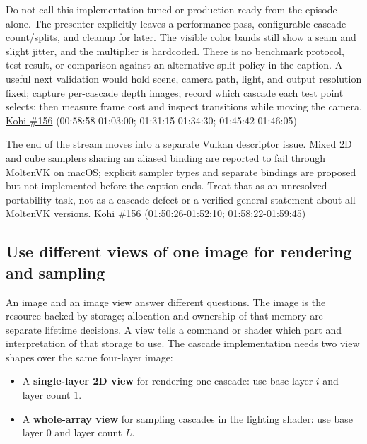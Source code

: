 Do not call this implementation tuned or production-ready from the episode alone. The presenter explicitly leaves a performance pass, configurable cascade count/splits, and cleanup for later. The visible color bands still show a seam and slight jitter, and the multiplier is hardcoded. There is no benchmark protocol, test result, or comparison against an alternative split policy in the caption. A useful next validation would hold scene, camera path, light, and output resolution fixed; capture per-cascade depth images; record which cascade each test point selects; then measure frame cost and inspect transitions while moving the camera. \href{https://www.youtube.com/watch?v=coWS_saBPBk}{Kohi \#156} (00:58:58-01:03:00; 01:31:15-01:34:30; 01:45:42-01:46:05)

The end of the stream moves into a separate Vulkan descriptor issue. Mixed 2D and cube samplers sharing an aliased binding are reported to fail through MoltenVK on macOS; explicit sampler types and separate bindings are proposed but not implemented before the caption ends. Treat that as an unresolved portability task, not as a cascade defect or a verified general statement about all MoltenVK versions. \href{https://www.youtube.com/watch?v=coWS_saBPBk}{Kohi \#156} (01:50:26-01:52:10; 01:58:22-01:59:45)

\subsection{Use different views of one image for rendering and sampling}\label{06-engine-ii-ch026-use-different-views-of-one-image-for-rendering-and-sampling}

\hypertarget{06-engine-ii-ch026-use-different-views-of-one-image-for-rendering-and-sampling}{}

An image and an image view answer different questions. The image is the resource backed by storage; allocation and ownership of that memory are separate lifetime decisions. A view tells a command or shader which part and interpretation of that storage to use. The cascade implementation needs two view shapes over the same four-layer image:

\begin{itemize}
\tightlist
\item
  A \textbf{single-layer 2D view} for rendering one cascade: use base layer \(i\) and layer count \(1\).
\item
  A \textbf{whole-array view} for sampling cascades in the lighting shader: use base layer \(0\) and layer count \(L\).
\end{itemize}

